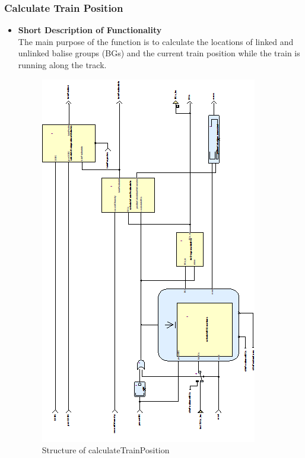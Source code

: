 \subsubsection{Calculate Train Position}\label{sss:calctrainpos}

\begin{itemize}
\item \textbf{Short Description of Functionality}\\
The main purpose of the function is to calculate the locations of linked and unlinked balise groups (BGs) and the current train position while the train is running along the track. 

\begin{figure}[hbtp]
\centering
\includegraphics[scale=1]{../images/CalculateTrainPosition.png}
\caption{Structure of calculateTrainPosition}
\end{figure}



\end{itemize}

